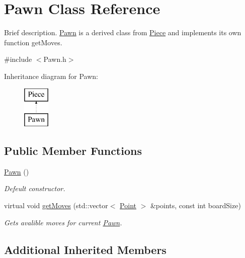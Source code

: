 \hypertarget{class_pawn}{\section{Pawn Class Reference}
\label{class_pawn}
}


Brief description. \hyperlink{class_pawn}{Pawn} is a derived class from \hyperlink{class_piece}{Piece} and implements its own function get\-Moves.  




{\ttfamily \#include $<$Pawn.\-h$>$}

Inheritance diagram for Pawn\-:\begin{figure}[H]
\begin{center}
\leavevmode
\includegraphics[height=2.000000cm]{class_pawn}
\end{center}
\end{figure}
\subsection*{Public Member Functions}
\begin{DoxyCompactItemize}
\item 
\hypertarget{class_pawn_ab7880b10c514f4b9fab9766fbe7c06fd}{\hyperlink{class_pawn_ab7880b10c514f4b9fab9766fbe7c06fd}{Pawn} ()}\label{class_pawn_ab7880b10c514f4b9fab9766fbe7c06fd}

\begin{DoxyCompactList}\small\item\em Defeult constructor. \end{DoxyCompactList}\item 
virtual void \hyperlink{class_pawn_ab08f4e1682965a0a251c60a9857685bf}{get\-Moves} (std\-::vector$<$ \hyperlink{struct_point}{Point} $>$ \&points, const int board\-Size)
\begin{DoxyCompactList}\small\item\em Gets avalible moves for current \hyperlink{class_pawn}{Pawn}. \end{DoxyCompactList}\end{DoxyCompactItemize}
\subsection*{Additional Inherited Members}


